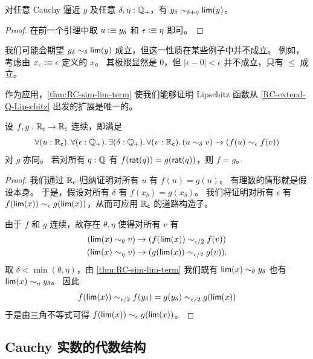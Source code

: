 \begin{lem}\label{thm:RC-sim-lim-term}
  对任意 Cauchy 逼近 $y$ 及任意 $\delta,\eta:\mathbb{Q}_{+}$，有 $y_\delta \sim_{\delta+\eta} \mathsf{lim}(y)$。
\end{lem}

\begin{proof}
  在前一个引理中取 $u\vcentcolon\equiv y_\delta$ 和 $\epsilon\vcentcolon\equiv \eta$ 即可。
\end{proof}

\begin{rmk}
  我们可能会期望 $y_\delta \sim_{\delta} \mathsf{lim}(y)$ 成立，但这一性质在某些例子中并不成立。
  例如，考虑由 $x_\epsilon \vcentcolon\equiv \epsilon$ 定义的 $x$。
  其极限显然是 $0$，但 $|\epsilon - 0 |<\epsilon$ 并不成立，只有 $\le$ 成立。
\end{rmk}

作为应用，\cref{thm:RC-sim-lim-term} 使我们能够证明 Lipschitz 函数从 \cref{RC-extend-Q-Lipschitz} 出发的扩展是唯一的。

\begin{lem}\label{RC-continuous-eq}
  设 $f,g:\mathbb{R}_\mathsf{c}\to\mathbb{R}_\mathsf{c}$ 连续，即满足
  \[ \fall{u:\RC}{\epsilon:\Qp}\exis{\delta:\Qp}\fall{v:\RC} (u\close\delta v) \to (f(u) \close\epsilon f(v)) \]
  对 $g$ 亦同。
  若对所有 $q:\mathbb{Q}$ 有 $f(\mathsf{rat}(q))=g(\mathsf{rat}(q))$，则 $f=g$。
\end{lem}

\begin{proof}
  我们通过 $\mathbb{R}_\mathsf{c}$-归纳证明对所有 $u$ 有 $f(u)=g(u)$。
  有理数的情形就是假设本身。
  于是，假设对所有 $\delta$ 有 $f(x_\delta)=g(x_\delta)$。
  我们将证明对所有 $\epsilon$ 有 $f(\mathsf{lim}(x))\sim_{\epsilon} g(\mathsf{lim}(x))$，从而可应用 $\mathbb{R}_\mathsf{c}$ 的道路构造子。

  由于 $f$ 和 $g$ 连续，故存在 $\theta,\eta$ 使得对所有 $v$ 有
  \begin{align*}
    (\mathsf{lim}(x)\sim_{\theta} v) &\to (f(\mathsf{lim}(x)) \sim_{\epsilon/2} f(v))\\
    (\mathsf{lim}(x)\sim_{\eta} v) &\to (g(\mathsf{lim}(x)) \sim_{\epsilon/2} g(v)).
  \end{align*}
  取 $\delta < \min(\theta,\eta)$，由 \cref{thm:RC-sim-lim-term} 我们既有 $\mathsf{lim}(x)\sim_{\theta} y_\delta$ 也有 $\mathsf{lim}(x)\sim_{\eta} y_\delta$。
  因此
  \[ f(\mathsf{lim}(x)) \sim_{\epsilon/2} f(y_\delta) = g(y_\delta) \sim_{\epsilon/2} g(\mathsf{lim}(x))\]
  于是由三角不等式可得 $f(\mathsf{lim}(x))\sim_{\epsilon} g(\mathsf{lim}(x))$。
\end{proof}

\subsection{Cauchy 实数的代数结构}
\label{sec:algebr-struct-cauchy}

